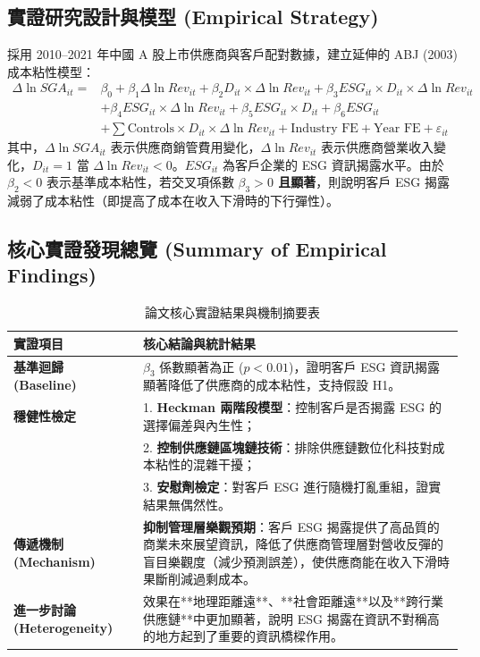 \documentclass[11pt,a4paper]{article}
\begin{document}
\subsection{實證研究設計與模型 (Empirical Strategy)}
採用 2010--2021 年中國 A 股上市供應商與客戶配對數據，建立延伸的 ABJ (2003) 成本粘性模型：
\begin{equation}
\begin{aligned}
\Delta \ln SGA_{it} = & \beta_0 + \beta_1 \Delta \ln Rev_{it} + \beta_2 D_{it} \times \Delta \ln Rev_{it} + \beta_3 ESG_{it} \times D_{it} \times \Delta \ln Rev_{it} \\
& + \beta_4 ESG_{it} \times \Delta \ln Rev_{it} + \beta_5 ESG_{it} \times D_{it} + \beta_6 ESG_{it} \\
& + \sum \text{Controls} \times D_{it} \times \Delta \ln Rev_{it} + \text{Industry FE} + \text{Year FE} + \varepsilon_{it}
\end{aligned}
\end{equation}
其中，$\Delta \ln SGA_{it}$ 表示供應商銷管費用變化，$\Delta \ln Rev_{it}$ 表示供應商營業收入變化，$D_{it} = 1$ 當 $\Delta \ln Rev_{it} < 0$。$ESG_{it}$ 為客戶企業的 ESG 資訊揭露水平。由於 $\beta_2 < 0$ 表示基準成本粘性，若交叉項係數 \textbf{$\beta_3 > 0$ 且顯著}，則說明客戶 ESG 揭露減弱了成本粘性（即提高了成本在收入下滑時的下行彈性）。

\subsection{核心實證發現總覽 (Summary of Empirical Findings)}

\begin{table}[h]
\centering
\caption{論文核心實證結果與機制摘要表}
\label{tab:paper2_summary}
\small
\begin{tabularx}{\textwidth}{lX}
\toprule
\textbf{實證項目} & \textbf{核心結論與統計結果} \\
\midrule
\textbf{基準迴歸 (Baseline)} & $\beta_3$ 係數顯著為正 ($p < 0.01$)，證明客戶 ESG 資訊揭露顯著降低了供應商的成本粘性，支持假設 H1。 \\
\textbf{穩健性檢定} & 1. \textbf{Heckman 兩階段模型}：控制客戶是否揭露 ESG 的選擇偏差與內生性；\\
 & 2. \textbf{控制供應鏈區塊鏈技術}：排除供應鏈數位化科技對成本粘性的混雜干擾；\\
 & 3. \textbf{安慰劑檢定}：對客戶 ESG 進行隨機打亂重組，證實結果無偶然性。 \\
\textbf{傳遞機制 (Mechanism)} & \textbf{抑制管理層樂觀預期}：客戶 ESG 揭露提供了高品質的商業未來展望資訊，降低了供應商管理層對營收反彈的盲目樂觀度（減少預測誤差），使供應商能在收入下滑時果斷削減過剩成本。 \\
\textbf{進一步討論 (Heterogeneity)} & 效果在**地理距離遠**、**社會距離遠**以及**跨行業供應鏈**中更加顯著，說明 ESG 揭露在資訊不對稱高的地方起到了重要的資訊橋樑作用。 \\
\bottomrule
\end{tabularx}
\end{table}
\end{document}
